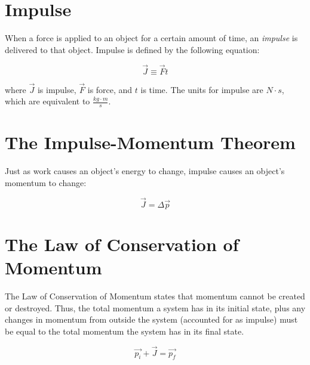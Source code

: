 	 
	\section{Impulse} \label{impulse} 
		When a force is applied to an object for a certain amount of time, an \textit{impulse} is delivered to that object.  Impulse is defined by the following equation:
	\begin{mdframed}[backgroundcolor=orange!20!white]
		\begin{equation}
		\vec{J} \equiv \vec{F} t 
		\label{eqn:Impulse}
		\end{equation}
	\end{mdframed}
	where $\vec{J}$ is impulse, $\vec{F}$ is force, and $t $ is time.  The units for impulse are $\si{N\cdot s}$, which are equivalent to $ \si{\frac{kg \cdot m}{s}}$.
	
	
	
	
	\section{The Impulse-Momentum Theorem}
	
	Just as work causes an object's energy to change, impulse causes an object's momentum to change:
	
		\begin{mdframed}[backgroundcolor=orange!20!white]
		\begin{equation}
		\vec{J} = \Delta \vec{p} 
		\label{eqn:ImpulseMomentumTheorum}
		\end{equation}
	\end{mdframed}
	
	
	
	
	\section{The Law of Conservation of Momentum}
	
	The Law of Conservation of Momentum states that momentum cannot be created or destroyed.  Thus, the total momentum a system has in its initial state, plus any changes in momentum from outside the system (accounted for as impulse) must be equal to the total momentum the system has in its final state.
	
	
	\begin{mdframed}[backgroundcolor=orange!20!white]
		\begin{equation}
			\vec{p_i} + \vec{J} = \vec{p_f}
			\label{eqn:ConservationofMomentum}
		\end{equation}
	\end{mdframed}
	

